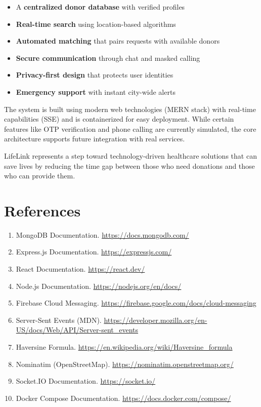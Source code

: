 \documentclass[12pt,a4paper]{article}
\begin{document}
\begin{itemize}[leftmargin=*]
    \item A \textbf{centralized donor database} with verified profiles
    \item \textbf{Real-time search} using location-based algorithms
    \item \textbf{Automated matching} that pairs requests with available donors
    \item \textbf{Secure communication} through chat and masked calling
    \item \textbf{Privacy-first design} that protects user identities
    \item \textbf{Emergency support} with instant city-wide alerts
\end{itemize}

The system is built using modern web technologies (MERN stack) with real-time capabilities (SSE) and is containerized for easy deployment. While certain features like OTP verification and phone calling are currently simulated, the core architecture supports future integration with real services.

LifeLink represents a step toward technology-driven healthcare solutions that can save lives by reducing the time gap between those who need donations and those who can provide them.

\newpage
\section*{References}

\begin{enumerate}[leftmargin=*]
    \item MongoDB Documentation. \url{https://docs.mongodb.com/}
    \item Express.js Documentation. \url{https://expressjs.com/}
    \item React Documentation. \url{https://react.dev/}
    \item Node.js Documentation. \url{https://nodejs.org/en/docs/}
    \item Firebase Cloud Messaging. \url{https://firebase.google.com/docs/cloud-messaging}
    \item Server-Sent Events (MDN). \url{https://developer.mozilla.org/en-US/docs/Web/API/Server-sent_events}
    \item Haversine Formula. \url{https://en.wikipedia.org/wiki/Haversine_formula}
    \item Nominatim (OpenStreetMap). \url{https://nominatim.openstreetmap.org/}
    \item Socket.IO Documentation. \url{https://socket.io/}
    \item Docker Compose Documentation. \url{https://docs.docker.com/compose/}
\end{enumerate}
\end{document}
